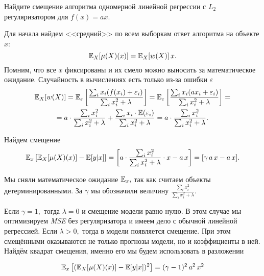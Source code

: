 \documentclass[12pt,fleqn]{article}
\begin{document}
\begin{vkProblem}
Найдите смещение алгоритма одномерной линейной регрессии с $L_2$ регуляризатором для $f(x) = ax$.
\end{vkProblem}
\begin{esSolution}
    Для начала найдем <<средний>> по всем выборкам ответ алгоритма на объекте $x$:
    \[
    \mathbb{E}_{X}[\mu(X)(x)] = \mathbb{E}_{X}[w(X)] \, x.
    \]
    Помним, что все $x$ фиксированы и их смело можно выносить за математическое ожидание. Случайность в вычислениях есть только из-за ошибки $\varepsilon$
    \begin{multline}
        \label{k_eq1}
        \EE_{X}[w(X)] = \EE_{\varepsilon} \left[\frac{\sum_i x_i (f(x_i) + \varepsilon_i)}{\sum_i x_i^2 + \lambda} \right] = \EE_{\varepsilon} \left[\frac{\sum_i x_i (ax_i + \varepsilon_i)}{\sum_i x_i^2 + \lambda} \right] = \\ =  a \cdot \frac{\sum_i x_i^2}{\sum_i x_i^2 + \lambda} + \frac{\sum_i x_i \cdot \EE(\varepsilon_i)}{\sum_i x_i^2 + \lambda} = a \cdot \frac{\sum_i x_i^2}{\sum_i x_i^2 + \lambda}.
    \end{multline}

    Найдем смещение
    \[
    \EE_{x} \left[\EE_{X}[\mu(X)(x)] - \EE[y|x]  \right] =  \left[a \cdot \frac{\sum_i x_i^2}{\sum_i x_i^2 + \lambda} \cdot x -  a\, x \right] = [\gamma\, a\, x -  a\, x ].
    \]

    Мы сняли математическое ожидание $\mathbb{E}_{x},$ так как считаем объекты детерминированными. За $\gamma$ мы обозначили величину $\frac{\sum_i x_i^2}{\sum_i x_i^2 + \lambda}$.  
    
    Если $\gamma = 1,$ тогда $\lambda = 0$ и смещение модели равно нулю. В этом случае мы оптимизируем \textit{MSE} без регуляризатора и имеем дело с обычной линейной регрессией. Если $\lambda > 0,$ тогда в модели появляется смещение. При этом смещёнными оказываются не только прогнозы модели, но и коэффициенты в ней. Найдём квадрат смещения, именно его мы будем использовать в разложении

    \[
    \mathbb{E}_{x} \left[(\mathbb{E}_{X}[\mu(X)(x)] - \mathbb{E}[y|x])^2 \right] = (\gamma - 1)^2\, a^2\, x^2
    \]
\end{esSolution}
\end{document}
